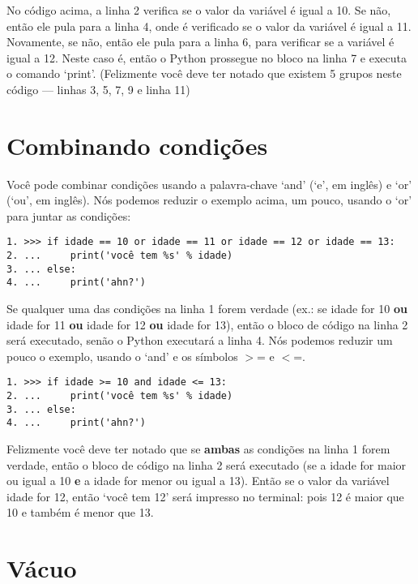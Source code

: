 No código acima, a linha 2 verifica se o valor da variável  é igual a 10. Se não, então ele pula para a linha 4, onde é verificado se o valor da variável  é igual a 11. Novamente, se não, então ele pula para a linha 6, para verificar se a variável é igual a 12. Neste caso é, então o Python prossegue no bloco na linha 7 e executa o comando `print'. (Felizmente você deve ter notado que existem 5 grupos neste código --- linhas 3, 5, 7, 9 e linha 11)

\section{Combinando condições}
Você pode combinar condições usando a palavra-chave `and' (`e', em inglês) e `or' (`ou', em inglês). Nós podemos reduzir o exemplo acima, um pouco, usando o `or' para juntar as condições:

\begin{listing}
\begin{verbatim}
1. >>> if idade == 10 or idade == 11 or idade == 12 or idade == 13:
2. ...     print('você tem %s' % idade)
3. ... else:
4. ...     print('ahn?')
\end{verbatim}
\end{listing}

Se qualquer uma das condições na linha 1 forem verdade (ex.: se idade for 10 \textbf{ou} idade for 11 \textbf{ou} idade for 12 \textbf{ou} idade for 13), então o bloco de código na linha 2 será executado, senão o Python executará a linha 4. Nós podemos reduzir um pouco o exemplo, usando o `and' e os símbolos $>$= e $<$=.

\begin{listing}
\begin{verbatim}
1. >>> if idade >= 10 and idade <= 13:
2. ...     print('você tem %s' % idade)
3. ... else:
4. ...     print('ahn?')
\end{verbatim}
\end{listing}

Felizmente você deve ter notado que se \textbf{ambas} as condições na linha 1 forem verdade, então o bloco de código na linha 2 será executado (se a idade for maior ou igual a 10 \textbf{e} a idade for menor ou igual a 13). Então  se o valor da variável idade for 12, então `você tem 12' será impresso no terminal: pois 12 é maior que 10 e também é menor que 13.

\section{Vácuo}

